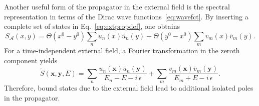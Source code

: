 %
Another useful form of the propagator in the external field is the spectral representation in terms of the Dirac wave functions~\eqref{eq:wavefct}. By inserting a complete set of states in Eq.~\eqref{eq:extpropdef}, one obtains
\begin{equation}
S_\mathcal{A}(x,y)=\Theta(x^0-y^0) \sum_n u_n(x)\bar{u}_n(y)
-\Theta(y^0-x^0)\sum_m v_m(x)\bar{v}_m(y).
\end{equation}
For a time-independent external field, a Fourier transformation in the zeroth component yields
\begin{equation}
\tilde{S}(\mathbf{x},\mathbf{y},E)= \sum_n \frac{u_n(\mathbf{x})\bar{u}_n(\mathbf{y})}{E_n -E -i\,\epsilon}
+\sum_m \frac{v_m(\mathbf{x})\bar{v}_m(\mathbf{y})}{E_m +E -i\,\epsilon}.
\label{eq:spectralrep}
\end{equation}
Therefore, bound states due to the external field lead to additional isolated poles in the propagator.

